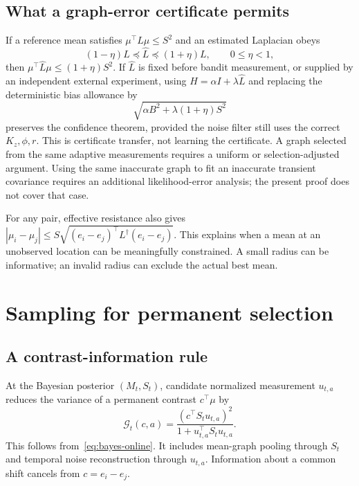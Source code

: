 \documentclass[11pt]{article}
\begin{document}
\subsection{What a graph-error certificate permits}
If a reference mean satisfies $\mu^\top L\mu\le S^2$ and an estimated Laplacian obeys
\begin{equation}
(1-\eta)L\preceq\widehat L\preceq(1+\eta)L,\qquad0\le\eta<1,
\label{eq:laplacian-perturbation}
\end{equation}
then $\mu^\top\widehat L\mu\le(1+\eta)S^2$. If $\widehat L$ is fixed before bandit measurement, or supplied by an independent external experiment, using $\widehat H=\alpha I+\lambda\widehat L$ and replacing the deterministic bias allowance by
\begin{equation}
\sqrt{\alpha B^2+\lambda(1+\eta)S^2}
\end{equation}
preserves the confidence theorem, provided the noise filter still uses the correct $K_z,\phi,r$. This is certificate transfer, not learning the certificate. A graph selected from the same adaptive measurements requires a uniform or selection-adjusted argument. Using the same inaccurate graph to fit an inaccurate transient covariance requires an additional likelihood-error analysis; the present proof does not cover that case.

For any pair, effective resistance also gives $|\mu_i-\mu_j|\le S\sqrt{(e_i-e_j)^\top L^\dagger(e_i-e_j)}$. This explains when a mean at an unobserved location can be meaningfully constrained. A small radius can be informative; an invalid radius can exclude the actual best mean.

\section{Sampling for permanent selection}
\subsection{A contrast-information rule}
At the Bayesian posterior $(M_t,S_t)$, candidate normalized measurement $u_{t,a}$ reduces the variance of a permanent contrast $c^\top\mu$ by
\begin{equation}
\boxed{\mathcal G_t(c,a)=
\frac{(c^\top S_tu_{t,a})^2}{1+u_{t,a}^\top S_tu_{t,a}}.}
\label{eq:contrast-gain}
\end{equation}
This follows from~\eqref{eq:bayes-online}. It includes mean-graph pooling through $S_t$ and temporal noise reconstruction through $u_{t,a}$. Information about a common shift cancels from $c=e_i-e_j$.
\end{document}

